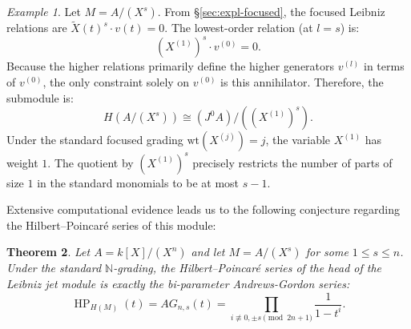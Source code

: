 \documentclass[a4paper, 12pt]{amsart}
\newtheorem{theorem}{Theorem}[section]
\theoremstyle{definition}
\theoremstyle{remark}
\newtheorem{example}[theorem]{Example}
\begin{document}
\begin{example}
  \label{exa:head-fat-point}
  Let $M = A/(X^s)$. 
  From \S\ref{sec:expl-focused}, the focused Leibniz relations are $\widetilde{X}(t)^s \cdot v(t) = 0$.
  The lowest-order relation (at $l = s$) is:
  \begin{equation*}
    (X^{(1)})^s \cdot v^{(0)} = 0.
  \end{equation*}
  Because the higher relations primarily define the higher generators $v^{(l)}$ in terms of $v^{(0)}$, the only constraint solely on $v^{(0)}$ is this annihilator.
  Therefore, the submodule is:
  \begin{equation*}
    H(A/(X^s)) \cong (J^0A) / ((X^{(1)})^s).
  \end{equation*}
  Under the standard focused grading $\mathrm{wt}(X^{(j)}) = j$, the variable $X^{(1)}$ has weight $1$. 
  The quotient by $(X^{(1)})^s$ precisely restricts the number of parts of size $1$ in the standard monomials to be at most $s - 1$.
\end{example}

Extensive computational evidence leads us to the following conjecture regarding the Hilbert--Poincar\'{e} series of this module:

\begin{theorem}
  \label{thm:head-AG}
  Let $A = k[X]/(X^n)$ and let $M = A/(X^s)$ for some $1 \le s \le n$. 
  Under the standard $\mathbb{N}$-grading, the Hilbert--Poincar\'{e} series of the head of the Leibniz jet module is exactly the bi-parameter Andrews-Gordon series:
  \begin{equation*}
    \operatorname{HP}_{H(M)}(t) = AG_{n,s}(t) = \prod_{i \not\equiv 0, \pm s \pmod{2n+1}} \frac{1}{1 - t^i}.
  \end{equation*}
\end{theorem}
\end{document}
